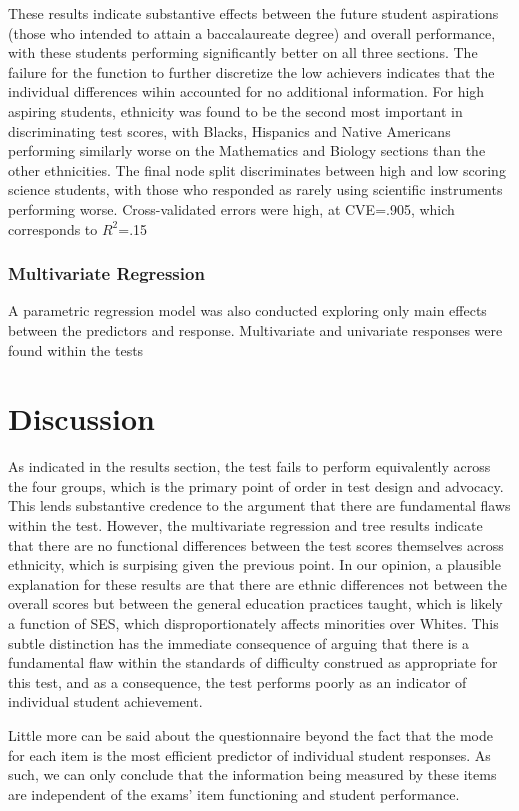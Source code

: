 \documentclass{article}\usepackage[]{graphicx}\usepackage[]{color}
\begin{document}
These results indicate substantive effects between the future student aspirations (those who intended to attain a baccalaureate degree) and overall performance, with these students performing significantly better on all three sections. The failure for the function to further discretize the low achievers indicates that the individual differences wihin accounted for no additional information. For high aspiring students, ethnicity was found to be the second most important in discriminating test scores, with Blacks, Hispanics and Native Americans performing similarly worse on the Mathematics and Biology sections than the other ethnicities. The final node split discriminates between high and low scoring science students, with those who responded as rarely using scientific instruments performing worse. Cross-validated errors were high, at CVE=.905, which corresponds to $R^2$=.15
\subsubsection{Multivariate Regression}
A parametric regression model was also conducted exploring only main effects between the predictors and response. Multivariate and univariate responses were found within the tests


\section{Discussion}
As indicated in the results section, the test fails to perform equivalently across the four groups, which is the primary point of order in test design and advocacy. This lends substantive credence to the argument that there are fundamental flaws within the test. However, the multivariate regression and tree results indicate that there are no functional differences between the test scores themselves across ethnicity, which is surpising given the previous point. In our opinion, a plausible explanation for these results are that there are ethnic differences not between the overall scores but between the general education practices taught, which is likely a function of SES, which disproportionately affects minorities over Whites. This subtle distinction has the immediate consequence of arguing that there is a fundamental flaw within the standards of difficulty construed as appropriate for this test, and as a consequence, the test performs poorly as an indicator of individual student achievement.

Little more can be said about the questionnaire beyond the fact that the mode for each item is the most efficient predictor of individual student responses. As such, we can only conclude that the information being measured by these items are independent of the exams' item functioning and student performance.


{}

\end{document}
